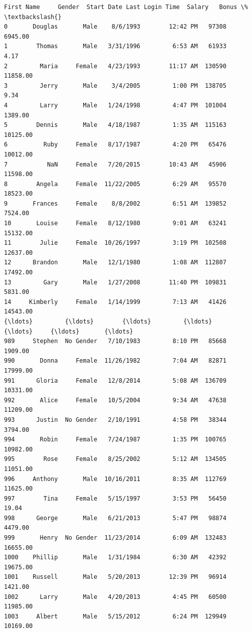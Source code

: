 \documentclass [oneside,10pt,a4paper,ngerman,BCOR10mm,headsepline,parindent,final]{scrartcl}
\makeatletter
\newcommand{\boxspacing}{\kern\kvtcb@left@rule\kern\kvtcb@boxsep}
\newcommand{\prompt}[4]{
        {\ttfamily\llap{{\color{#2}[#3]:\hspace{3pt}#4}}\vspace{-\baselineskip}}
    }
\makeatother
\begin{document}
            \begin{tcolorbox}[breakable, size=fbox, boxrule=.5pt, pad at break*=1mm, opacityfill=0]
\prompt{Out}{outcolor}{147}{\boxspacing}
\begin{Verbatim}[commandchars=\\\{\}]
     First Name     Gender  Start Date Last Login Time  Salary   Bonus \%  \textbackslash{}
0       Douglas       Male    8/6/1993        12:42 PM   97308   6945.00
1        Thomas       Male   3/31/1996         6:53 AM   61933      4.17
2         Maria     Female   4/23/1993        11:17 AM  130590  11858.00
3         Jerry       Male    3/4/2005         1:00 PM  138705      9.34
4         Larry       Male   1/24/1998         4:47 PM  101004   1389.00
5        Dennis       Male   4/18/1987         1:35 AM  115163  10125.00
6          Ruby     Female   8/17/1987         4:20 PM   65476  10012.00
7           NaN     Female   7/20/2015        10:43 AM   45906  11598.00
8        Angela     Female  11/22/2005         6:29 AM   95570  18523.00
9       Frances     Female    8/8/2002         6:51 AM  139852   7524.00
10       Louise     Female   8/12/1980         9:01 AM   63241  15132.00
11        Julie     Female  10/26/1997         3:19 PM  102508  12637.00
12      Brandon       Male   12/1/1980         1:08 AM  112807  17492.00
13         Gary       Male   1/27/2008        11:40 PM  109831   5831.00
14     Kimberly     Female   1/14/1999         7:13 AM   41426  14543.00
{\ldots}         {\ldots}        {\ldots}         {\ldots}             {\ldots}     {\ldots}       {\ldots}
989     Stephen  No Gender   7/10/1983         8:10 PM   85668   1909.00
990       Donna     Female  11/26/1982         7:04 AM   82871  17999.00
991      Gloria     Female   12/8/2014         5:08 AM  136709  10331.00
992       Alice     Female   10/5/2004         9:34 AM   47638  11209.00
993      Justin  No Gender   2/10/1991         4:58 PM   38344   3794.00
994       Robin     Female   7/24/1987         1:35 PM  100765  10982.00
995        Rose     Female   8/25/2002         5:12 AM  134505  11051.00
996     Anthony       Male  10/16/2011         8:35 AM  112769  11625.00
997        Tina     Female   5/15/1997         3:53 PM   56450     19.04
998      George       Male   6/21/2013         5:47 PM   98874   4479.00
999       Henry  No Gender  11/23/2014         6:09 AM  132483  16655.00
1000    Phillip       Male   1/31/1984         6:30 AM   42392  19675.00
1001    Russell       Male   5/20/2013        12:39 PM   96914   1421.00
1002      Larry       Male   4/20/2013         4:45 PM   60500  11985.00
1003     Albert       Male   5/15/2012         6:24 PM  129949  10169.00


\end{Verbatim}
\end{tcolorbox}
\end{document}
